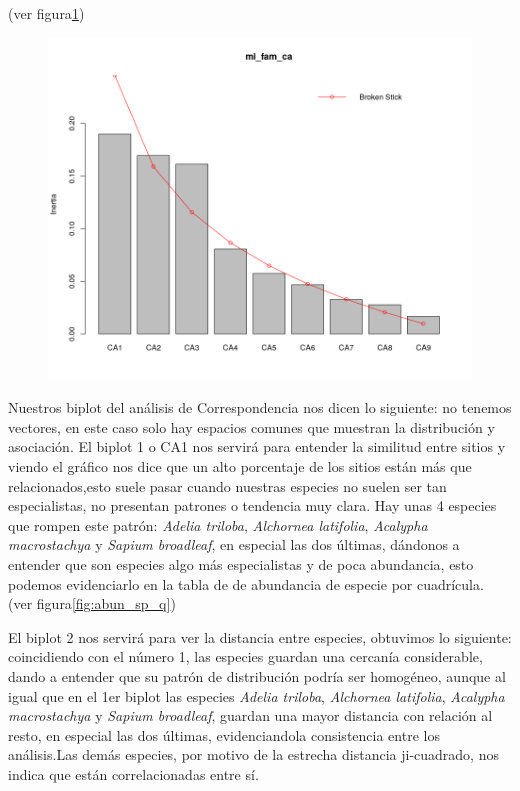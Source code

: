 \documentclass[11pt,]{article}
\begin{document}
(ver figura\ref{fig:AC})

\begin{figure}
\centering
\includegraphics{AC.png}
\caption{\label{fig:AC}}
\end{figure}

Nuestros biplot del análisis de Correspondencia nos dicen lo siguiente:
no tenemos vectores, en este caso solo hay espacios comunes que muestran
la distribución y asociación. El biplot 1 o CA1 nos servirá para
entender la similitud entre sitios y viendo el gráfico nos dice que un
alto porcentaje de los sitios están más que relacionados,esto suele
pasar cuando nuestras especies no suelen ser tan especialistas, no
presentan patrones o tendencia muy clara. Hay unas 4 especies que rompen
este patrón: \emph{Adelia triloba}, \emph{Alchornea latifolia},
\emph{Acalypha macrostachya} y \emph{Sapium broadleaf}, en especial las
dos últimas, dándonos a entender que son especies algo más especialistas
y de poca abundancia, esto podemos evidenciarlo en la tabla de de
abundancia de especie por cuadrícula. (ver figura\ref{fig:abun_sp_q})

El biplot 2 nos servirá para ver la distancia entre especies, obtuvimos
lo siguiente: coincidiendo con el número 1, las especies guardan una
cercanía considerable, dando a entender que su patrón de distribución
podría ser homogéneo, aunque al igual que en el 1er biplot las especies
\emph{Adelia triloba}, \emph{Alchornea latifolia}, \emph{Acalypha
macrostachya} y \emph{Sapium broadleaf}, guardan una mayor distancia con
relación al resto, en especial las dos últimas, evidenciandola
consistencia entre los análisis.Las demás especies, por motivo de la
estrecha distancia ji-cuadrado, nos indica que están correlacionadas
entre sí.
\end{document}
